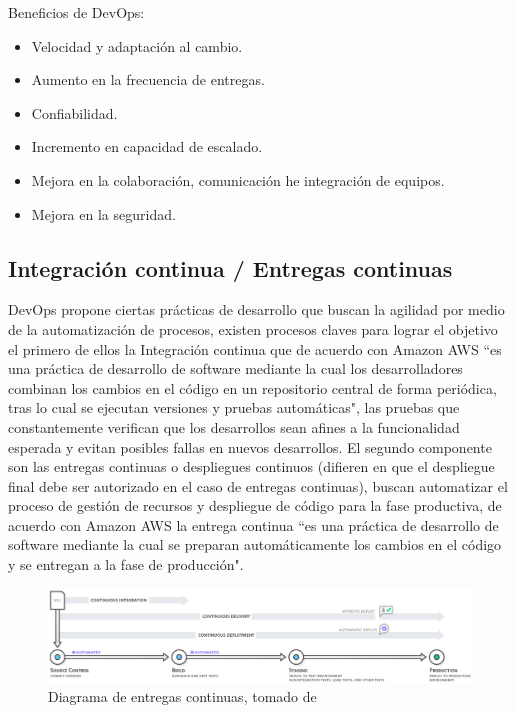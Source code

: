 Beneficios de DevOps:

\begin{itemize}
    \item Velocidad y adaptación al cambio.
    \item Aumento en la frecuencia de entregas.
    \item Confiabilidad.
    \item Incremento en capacidad de escalado.
    \item Mejora en la colaboración, comunicación he integración de equipos.
    \item Mejora en la seguridad.
\end{itemize}

\subsection{Integración continua / Entregas continuas}

DevOps propone ciertas prácticas de desarrollo que buscan la agilidad por medio de la automatización de procesos, existen procesos claves para lograr el objetivo el primero de ellos la Integración continua que de acuerdo con Amazon AWS \cite{awsIC} ``es una práctica de desarrollo de software mediante la cual los desarrolladores combinan los cambios en el código en un repositorio central de forma periódica, tras lo cual se ejecutan versiones y pruebas automáticas", las pruebas que constantemente verifican que los desarrollos sean afines a la funcionalidad esperada y evitan posibles fallas en nuevos desarrollos. El segundo componente son las entregas continuas o despliegues continuos (difieren en que el despliegue final debe ser autorizado en el caso de entregas continuas), buscan automatizar el proceso de gestión de recursos y despliegue de código para la fase productiva, de acuerdo con Amazon AWS \cite{awsEC} la entrega continua ``es una práctica de desarrollo de software mediante la cual se preparan automáticamente los cambios en el código y se entregan a la fase de producción".

\begin{figure}[H]
    \centering
    \includegraphics[width=\linewidth]{bibliografia/Imagenes/awsEC.eps}
    \caption{Diagrama de entregas continuas, tomado de \cite{awsEC}}
\end{figure}

